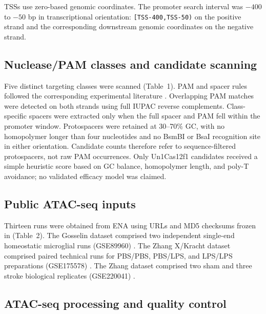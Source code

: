 \documentclass[11pt]{article}
\begin{document}
TSSs use zero-based genomic coordinates. The promoter search interval was $-400$ to $-50$ bp in transcriptional orientation: \texttt{[TSS-400,TSS-50)} on the positive strand and the corresponding downstream genomic coordinates on the negative strand.

\subsection{Nuclease/PAM classes and candidate scanning}

Five distinct targeting classes were scanned (Table~1). PAM and spacer rules followed the corresponding experimental literature \citep{friedland2015sa,zhang2021minicafe,edraki2019nme2,wang2024sminicra}. Overlapping PAM matches were detected on both strands using full IUPAC reverse complements. Class-specific spacers were extracted only when the full spacer and PAM fell within the promoter window. Protospacers were retained at 30--70\% GC, with no homopolymer longer than four nucleotides and no BsmBI or BsaI recognition site in either orientation. Candidate counts therefore refer to sequence-filtered protospacers, not raw PAM occurrences. Only Un1Cas12f1 candidates received a simple heuristic score based on GC balance, homopolymer length, and poly-T avoidance; no validated efficacy model was claimed.

\subsection{Public ATAC-seq inputs}

Thirteen runs were obtained from ENA using URLs and MD5 checksums frozen in  (Table~2). The Gosselin dataset comprised two independent single-end homeostatic microglial runs (GSE89960) \citep{gosselin2017environment}. The Zhang X/Kracht dataset comprised paired technical runs for PBS/PBS, PBS/LPS, and LPS/LPS preparations (GSE175578) \citep{zhangx2022innate}. The Zhang dataset comprised two sham and three stroke biological replicates (GSE220041) \citep{zhang2024hdac3stroke}.

\subsection{ATAC-seq processing and quality control}
\end{document}
